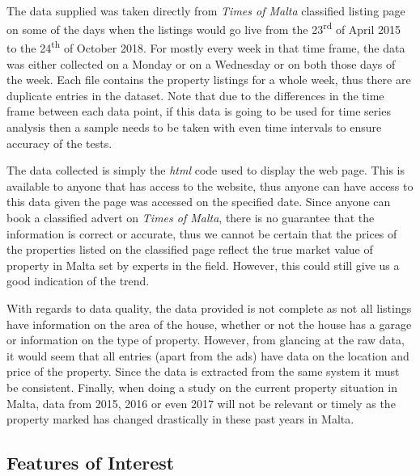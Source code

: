 \documentclass[12pt]{report}
\begin{document}
	\paragraph{ }The data supplied was taken directly from \textit{Times of Malta} classified listing page on some of the days when the listings would go live from the 23\textsuperscript{rd} of April 2015 to the 24\textsuperscript{th} of October 2018. For mostly every week in that time frame, the data was either collected on a Monday or on a Wednesday or on both those days of the week. Each file contains the property listings for a whole week, thus there are duplicate entries in the dataset. Note that due to the differences in the time frame between each data point, if this data is going to be used for time series analysis then a sample needs to be taken with even time intervals to ensure accuracy of the tests.
	
	\par The data collected is simply the \textit{html} code used to display the web page. This is available to anyone that has access to the website, thus anyone can have access to this data given the page was accessed on the specified date. Since anyone can book a classified advert on \textit{Times of Malta}, there is no guarantee that the information is correct or accurate, thus we cannot be certain that the prices of the properties listed on the classified page reflect the true market value of property in Malta set by experts in the field. However, this could still give us a good indication of the trend. 
	
	\par With regards to data quality, the data provided is not complete as not all listings have information on the area of the house, whether or not the house has a garage or information on the type of property. However, from glancing at the raw data, it would seem that all entries (apart from the ads) have data on the location and price of the property. Since the data is extracted from the same system it must be consistent. Finally, when doing a study on the current property situation in Malta, data from 2015, 2016 or even 2017 will not be relevant or timely as the property marked has changed drastically in these past years in Malta. 
	
	\subsection{Features of Interest}
\end{document}
